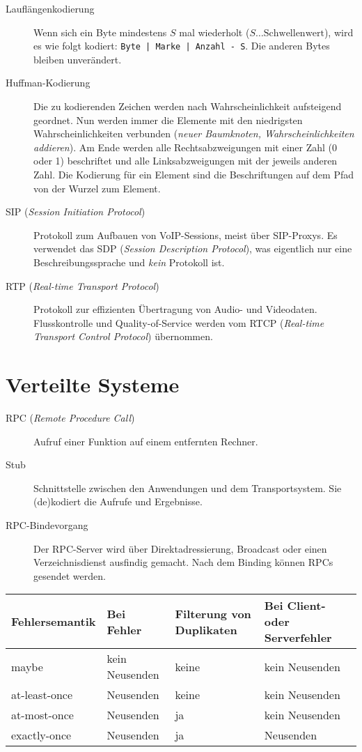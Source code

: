 \documentclass[a4paper]{article}
\begin{document}
\begin{description}
    \item[Lauflängenkodierung] Wenn sich ein Byte mindestens $S$ mal wiederholt ($S \ldots \text{Schwellenwert}$), wird es wie folgt kodiert: \texttt{Byte | Marke | Anzahl - S}. Die anderen Bytes bleiben unverändert.
    \item[Huffman-Kodierung] Die zu kodierenden Zeichen werden nach Wahrscheinlichkeit aufsteigend geordnet. Nun werden immer die Elemente mit den niedrigsten Wahrscheinlichkeiten verbunden (\textit{neuer Baumknoten, Wahrscheinlichkeiten addieren}). Am Ende werden alle Rechtsabzweigungen mit einer Zahl (0 oder 1) beschriftet und alle Linksabzweigungen mit der jeweils anderen Zahl. Die Kodierung für ein Element sind die Beschriftungen auf dem Pfad von der Wurzel zum Element.
    \item[SIP (\textit{Session Initiation Protocol})] Protokoll zum Aufbauen von VoIP-Sessions, meist über SIP-Proxys. Es verwendet das SDP (\textit{Session Description Protocol}), was eigentlich nur eine Beschreibungssprache und \textit{kein} Protokoll ist.
    \item[RTP (\textit{Real-time Transport Protocol})] Protokoll zur effizienten Übertragung von Audio- und Videodaten. Flusskontrolle und Quality-of-Service werden vom RTCP (\textit{Real-time Transport Control Protocol}) übernommen.
\end{description}

\section{Verteilte Systeme}

\begin{description}
    \item[RPC (\textit{Remote Procedure Call})] Aufruf einer Funktion auf einem entfernten Rechner.
    \item[Stub] Schnittstelle zwischen den Anwendungen und dem Transportsystem. Sie (de)kodiert die Aufrufe und Ergebnisse.
    \item[RPC-Bindevorgang] Der RPC-Server wird über Direktadressierung, Broadcast oder einen Verzeichnisdienst ausfindig gemacht. Nach dem Binding können RPCs gesendet werden.
\end{description}

\begin{tabular}{l|l|l|l}
    Fehlersemantik & Bei Fehler & Filterung von Duplikaten & Bei Client- oder Serverfehler \\ \hline
    maybe & kein Neusenden & keine & kein Neusenden \\
    at-least-once & Neusenden & keine & kein Neusenden \\
    at-most-once & Neusenden & ja & kein Neusenden \\
    exactly-once & Neusenden & ja & Neusenden
\end{tabular}
\end{document}
